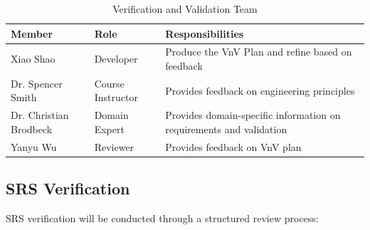 \documentclass[12pt, titlepage]{article}
\begin{document}
\begin{table}[]
\begin{tabularx}{\textwidth}{p{3cm}p{2cm}X}
\toprule 
    \textbf{Member} & \textbf{Role} & \textbf{Responsibilities} \\
\midrule
    Xiao Shao & Developer & Produce the VnV Plan and refine based on feedback \\
    Dr. Spencer Smith & Course Instructor & Provides feedback on engineering principles \\
    Dr. Christian Brodbeck & Domain Expert & Provides domain-specific information on requirements and validation \\
    Yanyu Wu & Reviewer & Provides feedback on VnV plan \\
\bottomrule
\end{tabularx}
\caption{Verification and Validation Team}
\end{table}



\subsection{SRS Verification}




SRS verification will be conducted through a structured review process:
\end{document}
